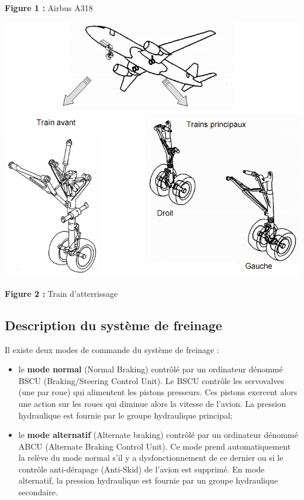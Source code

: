 \documentclass[11pt,oneside]{article}
\begin{document}
{\begin{minipage}[c]{.5\linewidth}
\begin{center}
\textbf{Figure 1 :} Airbus A318
\end{center}
\end{minipage}\hfill
\begin{minipage}[c]{.47\linewidth}
\begin{center}
\includegraphics[width=.95\textwidth]{png/image2.png}

\textbf{Figure 2 :} Train d'atterrissage
\end{center}
\end{minipage}

\subsection*{Description du système de freinage}

    Il existe deux modes de commande du système de freinage :
\begin{itemize}
 \item le \textbf{mode normal} (Normal Braking) contrôlé par un ordinateur dénommé BSCU
(Braking/Steering Control Unit). Le BSCU contrôle les servovalves (une par roue) qui
alimentent les pistons presseurs. Ces pistons exercent alors une action sur les roues qui
diminue alors la vitesse de l'avion. La pression hydraulique est fournie par le groupe hydraulique
principal;
\item le \textbf{mode alternatif} (Alternate braking) contrôlé par un ordinateur dénommé
ABCU (Alternate Braking Control Unit). Ce mode prend automatiquement la relève du mode
normal s’il y a dysfonctionnement de ce dernier ou si le contrôle anti-dérapage (Anti-Skid) de l’avion est supprimé. En mode alternatif, la pression hydraulique est fournie par
un groupe hydraulique secondaire.
\end{itemize}



}
\end{document}
